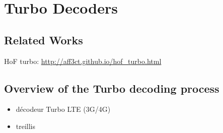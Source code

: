 \section{Turbo Decoders~\cite{Cassagne2016a}}

\subsection{Related Works}

HoF turbo: \url{http://aff3ct.github.io/hof_turbo.html}

\subsection{Overview of the Turbo decoding process}
\label{sec:turbo_overview}

\begin{itemize}
  \item décodeur Turbo LTE (3G/4G)
  \item treillis
\end{itemize}


